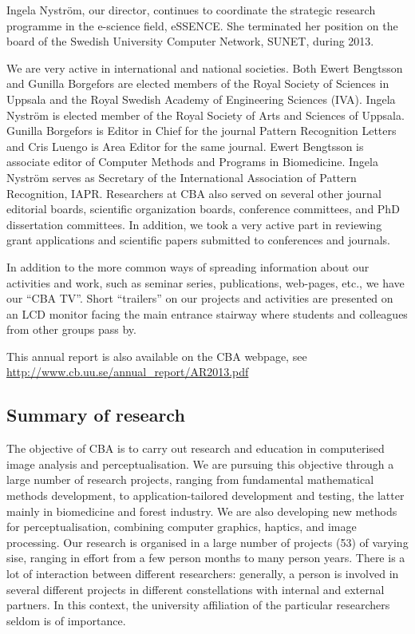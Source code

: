 Ingela Nystr\"{o}m, our director, continues to coordinate the strategic research programme in the e-science field, eSSENCE. She terminated her position on the board of the Swedish University Computer Network, SUNET, during 2013. 

We are very active in international and national societies. 
Both Ewert Bengtsson and Gunilla Borgefors are elected members of the Royal Society of Sciences in Uppsala and the Royal Swedish Academy of Engineering Sciences (IVA). Ingela Nystr\"{o}m is elected member of the Royal Society of Arts and Sciences of Uppsala. 
Gunilla Borgefors is Editor in Chief for the journal Pattern Recognition Letters and Cris Luengo is Area Editor for the same journal. Ewert Bengtsson is associate editor of Computer Methods and Programs in Biomedicine. Ingela Nystr\"{o}m serves as Secretary of the International Association of Pattern Recognition, IAPR.
 Researchers at CBA also served on several other journal editorial boards, scientific organization boards, conference committees, and PhD dissertation committees. In addition, we took a very active part in reviewing grant applications and scientific papers submitted to conferences and journals. 

In addition to the more common ways of spreading information about our activities and work, such as seminar series, publications, web-pages, etc., we have our ``CBA TV''. Short ``trailers'' on our projects and activities are presented on an LCD monitor facing the main entrance stairway where students and colleagues from other groups pass by.

This annual report is also available on the CBA webpage, see \url{http://www.cb.uu.se/annual_report/AR2013.pdf}
\vfill
\subsection{Summary of research}\label{sect:summary}
The objective of CBA is to carry out research and education in computerised image analysis and perceptualisation. We are pursuing this objective through a large number of research projects, ranging from fundamental mathematical methods development, to application-tailored development and testing, the latter mainly in biomedicine and forest industry. We are also developing new methods for perceptualisation, combining computer graphics, haptics, and image processing.
Our research is organised in a large number of projects (53) of varying sise, ranging in effort from a few person months to many person years. There is a lot of interaction between different researchers: generally, a person is involved in several different projects in different constellations with internal and external partners. In this context, the university affiliation of the particular researchers seldom is of importance.

